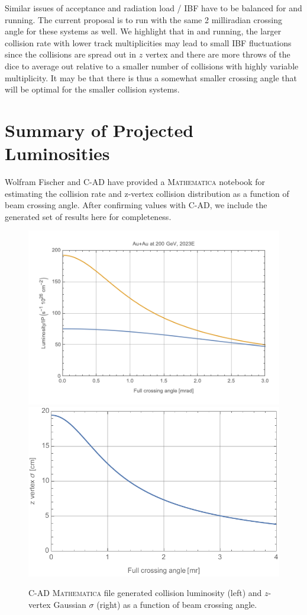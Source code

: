 Similar issues of acceptance and radiation load / IBF have to be balanced for \pp and \pau running.   The current proposal is to run with the same 2 milliradian crossing angle for these systems as well.    We highlight that in \pp and \pau running, the larger collision rate with lower track multiplicities may lead to small IBF fluctuations since the collisions are spread out in $z$ vertex and there are more throws of the dice to average out relative to a smaller number of \auau collisions with highly variable multiplicity.     It may be that there is thus a somewhat smaller crossing angle that will be optimal for the smaller collision systems.    

\section{Summary of Projected Luminosities} 

Wolfram Fischer and C-AD have provided a {\textsc{Mathematica}} notebook for estimating the collision rate and z-vertex collision distribution as a function of beam crossing angle.  After confirming values with C-AD, we include the generated set of results here for completeness.    

\begin{figure}[h!]
    \centering
        \includegraphics[width=0.7\linewidth]{figs/figure_cad1_prelim.png}  
    \includegraphics[width=0.62\linewidth]{figs/auau200-2023-202008131-z.pdf}
    \caption{C-AD {\textsc{Mathematica}} file generated \auau collision luminosity (left) and $z$-vertex Gaussian $\sigma$ (right) as a function of beam crossing angle.}
    \label{fig:mathauau1}
\end{figure}

